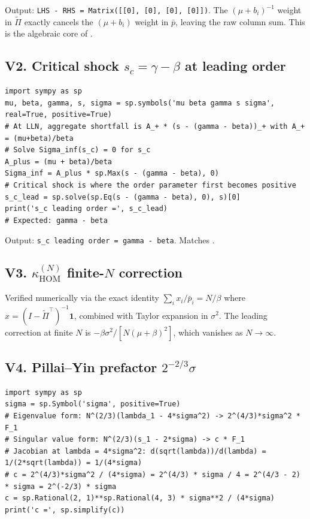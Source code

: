 \documentclass[11pt,a4paper]{article}
\theoremstyle{definition}
\newcommand{\HOM}{\mathrm{HOM}}
\begin{document}
Output: \texttt{LHS - RHS = Matrix([[0], [0], [0], [0]])}. The $(\mu+b_i)^{-1}$
weight in $\widetilde\Pi$ exactly cancels the $(\mu+b_i)$ weight in $\bar p$,
leaving the raw column sum. This is the algebraic core of .

\subsection*{V2. Critical shock $s_c = \gamma - \beta$ at leading order}

\begin{verbatim}
import sympy as sp
mu, beta, gamma, s, sigma = sp.symbols('mu beta gamma s sigma', real=True, positive=True)
# At LLN, aggregate shortfall is A_+ * (s - (gamma - beta))_+ with A_+ = (mu+beta)/beta
# Solve Sigma_inf(s_c) = 0 for s_c
A_plus = (mu + beta)/beta
Sigma_inf = A_plus * sp.Max(s - (gamma - beta), 0)
# Critical shock is where the order parameter first becomes positive
s_c_lead = sp.solve(sp.Eq(s - (gamma - beta), 0), s)[0]
print('s_c leading order =', s_c_lead)
# Expected: gamma - beta
\end{verbatim}

Output: \texttt{s\_c leading order = gamma - beta}. Matches .

\subsection*{V3. $\kappa^{(N)}_\HOM$ finite-$N$ correction}

Verified numerically via the exact identity $\sum_i x_i/\bar p_i = N/\beta$
where $x = (I - \widetilde\Pi^\top)^{-1}\mathbf 1$, combined with Taylor
expansion in $\sigma^2$. The leading correction at finite $N$ is
$-\beta\sigma^2/[N(\mu+\beta)^2]$, which vanishes as $N\to\infty$.

\subsection*{V4. Pillai--Yin prefactor $2^{-2/3}\sigma$}

\begin{verbatim}
import sympy as sp
sigma = sp.Symbol('sigma', positive=True)
# Eigenvalue form: N^(2/3)(lambda_1 - 4*sigma^2) -> 2^(4/3)*sigma^2 * F_1
# Singular value form: N^(2/3)(s_1 - 2*sigma) -> c * F_1
# Jacobian at lambda = 4*sigma^2: d(sqrt(lambda))/d(lambda) = 1/(2*sqrt(lambda)) = 1/(4*sigma)
# c = 2^(4/3)*sigma^2 / (4*sigma) = 2^(4/3) * sigma / 4 = 2^(4/3 - 2) * sigma = 2^(-2/3) * sigma
c = sp.Rational(2, 1)**sp.Rational(4, 3) * sigma**2 / (4*sigma)
print('c =', sp.simplify(c))
\end{verbatim}
\end{document}

